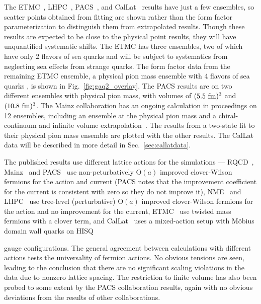 The ETMC~\cite{Alexandrou:2020okk}, LHPC~\cite{Hasan:2017wwt},
 PACS~\cite{Ishikawa:2018rew,Shintani:2018ozy,Ishikawa:2021eut}, and CalLat~\cite{Meyer:2021vfq}
 results have just a few ensembles, so scatter points obtained from fitting
 are shown rather than the form factor parameterization to distinguish
 them from extrapolated results.
Though these results are expected to be close to the physical point results,
 they will have unquantified systematic shifts.
The ETMC has three ensembles, two of which have only 2 flavors of sea quarks
 and will be subject to systematics from neglecting sea effects from strange quarks.
The form factor data from the remaining ETMC ensemble,
 a physical pion mass ensemble with 4 flavors of sea quarks ,
 is shown in Fig.~\ref{fig:gaq2_overlay}.
The PACS results are on two different ensembles with physical pion mass,
 with volumes of $(5.5~{\rm fm})^3$ and $(10.8~{\rm fm})^3$.
The Mainz collaboration has an ongoing calculation in proceedings on 12 ensembles,
 including an ensemble at the physical pion mass
 and a chiral-continuum and infinite volume extrapolation~\cite{Djukanovic:2021yqg}.
The results from a two-state fit to their physical pion mass ensemble
 are plotted with the other results.
The CalLat data will be described in more detail in Sec.~\ref{sec:callatdata}.

The published results use different lattice actions for the simulations ---
RQCD~\cite{RQCD:2019jai}, Mainz~\cite{Djukanovic:2021yqg} and PACS~\cite{Ishikawa:2018rew,Shintani:2018ozy,Ishikawa:2021eut} use non-peturbatively $\mathrm{O}(a)$ improved clover-Wilson fermions for the action and current (PACS notes that the improvement coefficient for the current is consistent with zero so they do not improve it),
NME~\cite{Park:2021ypf} and LHPC~\cite{Hasan:2017wwt} use tree-level (perturbative) $\mathrm{O}(a)$ improved clover-Wilson fermions for the action and no improvement for the current,
 ETMC~\cite{Alexandrou:2020okk} use twisted mass fermions with a clover term,
 and CalLat~\cite{Meyer:2021vfq} uses a mixed-action setup with M\"obius domain wall quarks
 on HISQ~\cite{MILC:2012znn}%
 \begin{marginnote}
 \end{marginnote}%
 gauge configurations.
The general agreement between calculations with different actions tests
 the universality of fermion actions.
No obvious tensions are seen,
 leading to the conclusion that there are no significant scaling violations
 in the data due to nonzero lattice spacing.
The restriction to finite volume has also been probed to some extent by
 the PACS collaboration results, %
 again with no obvious deviations from the results of other collaborations.

